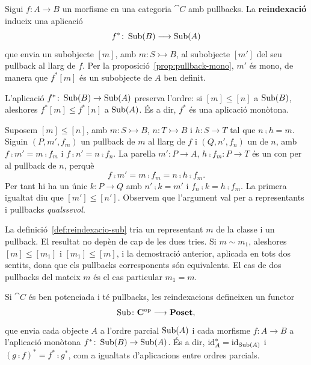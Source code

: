 \begin{definicio}
\label{def:reindexacio-sub}
Sigui $f\colon A\to B$ un morfisme en una categoria $\cat{C}$ amb pullbacks. La \textbf{reindexació} indueix una aplicació
\[
f^{*}\colon\operatorname{Sub}(B)\longrightarrow\operatorname{Sub}(A)
\]
que envia un subobjecte $[m]$, amb $m\colon S\rightarrowtail B$, al subobjecte $[m']$ del seu pullback al llarg de $f$. Per la proposició~\ref{prop:pullback-mono}, $m'$ és mono, de manera que $f^{*}[m]$ és un subobjecte de $A$ ben definit.
\end{definicio}

\begin{proposicio}
\label{prop:reindexacio-monotona}
L'aplicació $f^{*}\colon\operatorname{Sub}(B)\to\operatorname{Sub}(A)$ preserva l'ordre: si $[m]\leq[n]$ a $\operatorname{Sub}(B)$, aleshores $f^{*}[m]\leq f^{*}[n]$ a $\operatorname{Sub}(A)$. És a dir, $f^{*}$ és una aplicació monòtona.
\end{proposicio}

\begin{prova}
Suposem $[m]\leq[n]$, amb $m\colon S\rightarrowtail B$, $n\colon T\rightarrowtail B$ i $h\colon S\to T$ tal que $n\comp h=m$. Siguin $(P,m',f_m)$ un pullback de $m$ al llarg de $f$ i $(Q,n',f_n)$ un de $n$, amb $f\comp m'=m\comp f_m$ i $f\comp n'=n\comp f_n$. La parella $m'\colon P\to A$, $h\comp f_m\colon P\to T$ és un con per al pullback de $n$, perquè
\[
f\comp m'=m\comp f_m=n\comp h\comp f_m.
\]
Per tant hi ha un únic $k\colon P\to Q$ amb $n'\comp k=m'$ i $f_n\comp k=h\comp f_m$. La primera igualtat diu que $[m']\leq[n']$. Observem que l'argument val per a representants i pullbacks \emph{qualssevol}.
\end{prova}

\begin{observacio}\label{obs:reindexacio-ben-definida}
La definició~\ref{def:reindexacio-sub} tria un representant $m$ de la classe i un pullback. El resultat no depèn de cap de les dues tries. Si $m\sim m_1$, aleshores $[m]\leq[m_1]$ i $[m_1]\leq[m]$, i la demostració anterior, aplicada en tots dos sentits, dona que els pullbacks corresponents són equivalents. El cas de dos pullbacks del mateix $m$ és el cas particular $m_1=m$.
\end{observacio}

\begin{proposicio}\label{prop:functor-sub}
Si $\cat{C}$ és ben potenciada i té pullbacks, les reindexacions defineixen un functor
\[
\operatorname{Sub}\colon\mathbf{C}^{\mathrm{op}}\longrightarrow\mathbf{Poset},
\]
que envia cada objecte $A$ a l'ordre parcial $\operatorname{Sub}(A)$ i cada morfisme $f\colon A\to B$ a l'aplicació monòtona $f^{*}\colon\operatorname{Sub}(B)\to\operatorname{Sub}(A)$. És a dir, $\operatorname{id}_A^{*}=\operatorname{id}_{\operatorname{Sub}(A)}$ i $(g\comp f)^{*}=f^{*}\comp g^{*}$, com a igualtats d'aplicacions entre ordres parcials.
\end{proposicio}

